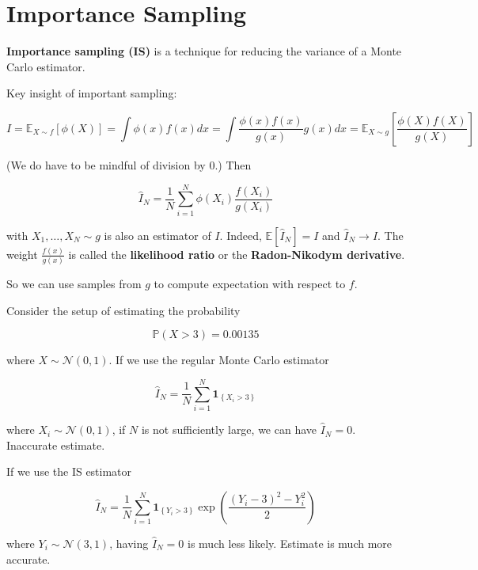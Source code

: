 \section{Importance Sampling}

\begin{definition}
    \textbf{Importance sampling (IS)} is a technique for reducing the variance of a Monte Carlo estimator.

    Key insight of important sampling:

    $$
    I=\mathbb{E}_{X \sim f}[\phi(X)]=\int \phi(x) f(x) d x=\int \frac{\phi(x) f(x)}{g(x)} g(x) d x=\mathbb{E}_{X \sim g}\left[\frac{\phi(X) f(X)}{g(X)}\right]
    $$

    (We do have to be mindful of division by 0.) Then

    $$
    \hat{I}_{N}=\frac{1}{N} \sum_{i=1}^{N} \phi\left(X_{i}\right) \frac{f\left(X_{i}\right)}{g\left(X_{i}\right)}
    $$

    with $X_{1}, \ldots, X_{N} \sim g$ is also an estimator of $I$.
    Indeed, $\mathbb{E}\left[\hat{I}_{N}\right]=I$ and $\hat{I}_{N} \rightarrow I$.
    The weight $\frac{f(x)}{g(x)}$ is called the \textbf{likelihood ratio} or the \textbf{Radon-Nikodym derivative}.

    So we can use samples from $g$ to compute expectation with respect to $f$.
\end{definition}

\begin{example}[13.6][IS Example]
    Consider the setup of estimating the probability

    $$
    \mathbb{P}(X>3)=0.00135
    $$

    where $X \sim \mathcal{N}(0,1)$. If we use the regular Monte Carlo estimator

    $$
    \hat{I}_{N}=\frac{1}{N} \sum_{i=1}^{N} \mathbf{1}_{\left\{X_{i}>3\right\}}
    $$

    where $X_{i} \sim \mathcal{N}(0,1)$, if $N$ is not sufficiently large, we can have $\hat{I}_{N}=0$. Inaccurate estimate.

    If we use the IS estimator

    $$
    \hat{I}_{N}=\frac{1}{N} \sum_{i=1}^{N} \mathbf{1}_{\left\{Y_{i}>3\right\}} \exp \left(\frac{\left(Y_{i}-3\right)^{2}-Y_{i}^{2}}{2}\right)
    $$

    where $Y_{i} \sim \mathcal{N}(3,1)$, having $\hat{I}_{N}=0$ is much less likely. Estimate is much more accurate.
\end{example}

